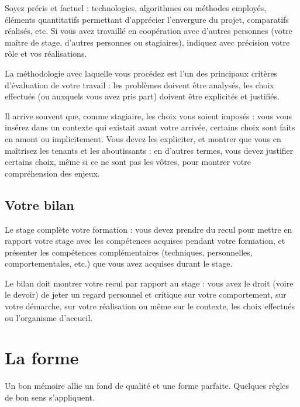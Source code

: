 \documentclass [twoside,openright,a4paper,11pt,french] {report}
\begin{document}
Soyez précis et factuel : technologies, algorithmes ou méthodes
employés, éléments quantitatifs permettant d'apprécier l'envergure
du projet, comparatifs réalisés, etc. Si vous avez travaillé en
coopération avec d'autres personnes (votre maître de stage, d'autres
personnes ou stagiaires), indiquez avec précision votre rôle et vos
réalisations.

La méthodologie avec laquelle vous procédez est l'un des principaux
critères d'évaluation de votre travail : les problèmes doivent
être analysés, les choix effectués (ou auxquels vous avez pris part)
doivent être explicités et justifiés.

Il arrive souvent que, comme stagiaire, les choix vous soient imposés :
vous vous insérez dans un contexte qui existait avant votre arrivée,
certains choix sont faits en amont ou implicitement. Vous devez
les expliciter, et montrer que vous en maîtrisez les tenants et les
aboutissants : en d'autres termes, vous devez justifier certains choix,
même si ce ne sont pas les vôtres, pour montrer votre compréhension
des enjeux.

\section {Votre bilan}

Le stage complète votre formation : vous devez prendre du recul pour
mettre en rapport votre stage avec les compétences acquises pendant votre
formation, et présenter les compétences complémentaires (techniques,
personnelles, comportementales, etc.) que vous avez acquises durant
le stage.

Le bilan doit montrer votre recul par rapport au stage : vous avez le
droit (voire le devoir) de jeter un regard personnel et critique sur
votre comportement, sur votre démarche, sur votre réalisation ou même
sur le contexte, les choix effectués ou l'organisme d'accueil.



\chapter {La forme}
    \label {chap:contexte}

Un bon mémoire allie un fond de qualité et une forme parfaite. Quelques
règles de bon sens s'appliquent.
\end{document}
